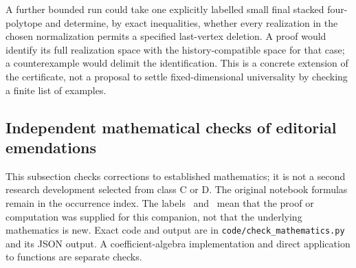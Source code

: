 A further bounded run could take one explicitly labelled small final
stacked four-polytope and determine, by exact inequalities, whether every
realization in the chosen normalization permits a specified last-vertex
deletion. A proof would identify its full realization space with the
history-compatible space for that case; a counterexample would delimit
the identification. This is a concrete extension of the certificate,
not a proposal to settle fixed-dimensional universality by checking a
finite list of examples.

\subsection{Independent mathematical checks of editorial emendations}
\label{checks:1985}

This subsection checks corrections to established mathematics; it is not a second
research development selected from class C or D. The original notebook formulas
remain in the occurrence index. The labels \ours\ and \oursComputed\ mean that
the proof or computation was supplied for this companion, not that the underlying
mathematics is new. Exact code and output are in
\texttt{code/check\_mathematics.py} and its JSON output. A coefficient-algebra
implementation and direct application to functions are separate checks.

